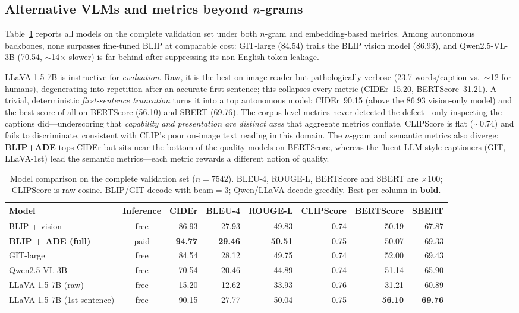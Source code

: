 \subsection{Alternative VLMs and metrics beyond $n$-grams}
\label{sec:res:vlms}
Table~\ref{tab:vlms} reports all models on the complete validation set under both
$n$-gram and embedding-based metrics. Among autonomous backbones, none surpasses
fine-tuned BLIP at comparable cost: GIT-large (\num{84.54}) trails the BLIP vision
model (\num{86.93}), and Qwen2.5-VL-3B (\num{70.54}, $\sim$\num{14}$\times$ slower)
is far behind after suppressing its non-English token leakage.

LLaVA-1.5-7B is instructive for \emph{evaluation}. Raw, it is the best on-image
reader but pathologically verbose (\num{23.7} words/caption vs.\ $\sim$\num{12} for
humans), degenerating into repetition after an accurate first sentence; this
collapses every metric (CIDEr~\num{15.20}, BERTScore~\num{31.21}). A trivial,
deterministic \emph{first-sentence truncation} turns it into a top autonomous model:
CIDEr~\num{90.15} (above the \num{86.93} vision-only model) and the best score of all
on BERTScore (\num{56.10}) and SBERT (\num{69.76}). The corpus-level metrics never
detected the defect---only inspecting the captions did---underscoring that
\emph{capability and presentation are distinct axes} that aggregate metrics conflate.
CLIPScore is flat ($\sim$\num{0.74}) and fails to discriminate, consistent with CLIP's
poor on-image text reading in this domain. The $n$-gram and semantic metrics also
diverge: \textbf{BLIP+ADE} tops CIDEr but sits near the bottom of the quality models
on BERTScore, whereas the fluent LLM-style captioners (GIT, LLaVA-1st) lead the
semantic metrics---each metric rewards a different notion of quality.

\begin{table}[t]
\centering
\caption{Model comparison on the complete validation set ($n{=}7542$). BLEU-4,
ROUGE-L, BERTScore and SBERT are $\times 100$; CLIPScore is raw cosine. BLIP/GIT
decode with beam${=}3$; Qwen/LLaVA decode greedily. Best per column in \textbf{bold}.}
\label{tab:vlms}
\begin{tabular}{lcrrrrrr}
\toprule
Model & Inference & CIDEr & BLEU-4 & ROUGE-L & CLIPScore & BERTScore & SBERT \\
\midrule
BLIP + vision                 & free & 86.93 & 27.93 & 49.83 & 0.74 & 50.19 & 67.87 \\
\textbf{BLIP + ADE (full)}    & paid & \textbf{94.77} & \textbf{29.46} & \textbf{50.51} & 0.75 & 50.07 & 69.33 \\
GIT-large                     & free & 84.54 & 28.12 & 49.75 & 0.74 & 52.00 & 69.43 \\
Qwen2.5-VL-3B                 & free & 70.54 & 20.46 & 44.89 & 0.74 & 51.14 & 65.90 \\
LLaVA-1.5-7B (raw)            & free & 15.20 & 12.62 & 33.93 & 0.76 & 31.21 & 60.89 \\
LLaVA-1.5-7B (1st sentence)   & free & 90.15 & 27.77 & 50.04 & 0.75 & \textbf{56.10} & \textbf{69.76} \\
\bottomrule
\end{tabular}
\end{table}
